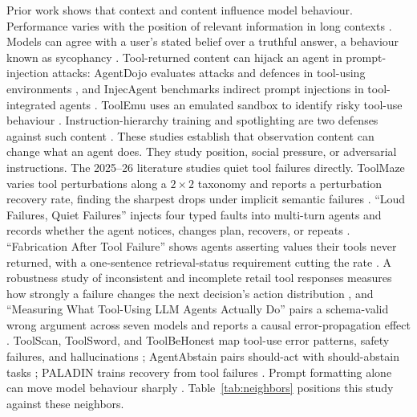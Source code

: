 \documentclass[a4paper,fleqn]{cas-sc}
\begin{document}
Prior work shows that context and content influence model behaviour. Performance varies with the
position of relevant information in long contexts \cite{lostmiddle}. Models can agree with a
user's stated belief over a truthful answer, a behaviour known as sycophancy \cite{sycophancy}.
Tool-returned content can hijack an agent in prompt-injection attacks: AgentDojo evaluates
attacks and defences in tool-using environments \cite{agentdojo}, and InjecAgent benchmarks
indirect prompt injections in tool-integrated agents \cite{injecagent}. ToolEmu uses an emulated
sandbox to identify risky tool-use behaviour \cite{toolemu}. Instruction-hierarchy training and
spotlighting are two defenses against such content \cite{instruction_hierarchy,spotlighting}.
These studies establish that
observation content can change what an agent does. They study position, social pressure, or
adversarial instructions. The 2025--26 literature studies quiet tool failures directly.
ToolMaze varies tool perturbations along a $2\times2$ taxonomy and reports a perturbation
recovery rate, finding the sharpest drops under implicit semantic failures \cite{toolmaze}.
``Loud Failures, Quiet Failures'' injects four typed faults into multi-turn agents and
records whether the agent notices, changes plan, recovers, or repeats \cite{loudfailures}.
``Fabrication After Tool Failure'' shows agents asserting values their tools never returned,
with a one-sentence retrieval-status requirement cutting the rate \cite{fabrication}.
A robustness study of inconsistent and incomplete retail tool responses measures how
strongly a failure changes the next decision's action distribution \cite{robustagents}, and
``Measuring What Tool-Using LLM Agents Actually Do'' pairs a schema-valid wrong argument
across seven models and reports a causal error-propagation effect \cite{measuringwhat}.
ToolScan, ToolSword, and ToolBeHonest map tool-use error patterns, safety failures, and
hallucinations \cite{toolscan,toolsword,toolbehonest}; AgentAbstain pairs should-act with
should-abstain tasks \cite{agentabstain}; PALADIN trains recovery from tool failures
\cite{paladin}. Prompt formatting alone can move model behaviour sharply \cite{sclar}.
Table~\ref{tab:neighbors} positions this study against these neighbors.
\end{document}
